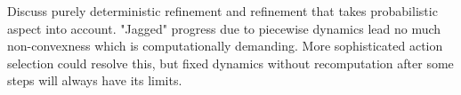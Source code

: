     Discuss purely deterministic refinement and refinement that takes probabilistic aspect into account.
    "Jagged" progress due to piecewise dynamics lead no much non-convexness which is computationally demanding.
    More sophisticated action selection could resolve this, but fixed dynamics without recomputation after some steps will always have its limits.

\stopsubsection

